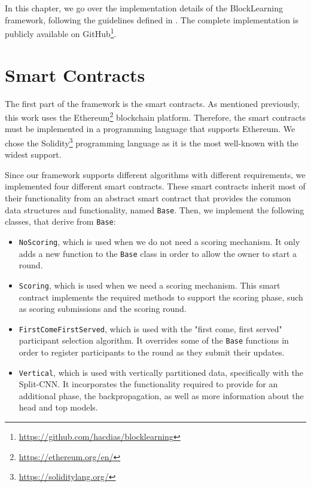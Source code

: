 In this chapter, we go over the implementation details of the BlockLearning framework, following the guidelines defined in . The complete implementation is publicly available on GitHub\footnote{\url{https://github.com/hacdias/blocklearning}}.

\section{Smart Contracts}

The first part of the framework is the smart contracts. As mentioned previously, this work uses the Ethereum\footnote{\url{https://ethereum.org/en/}} blockchain platform. Therefore, the smart contracts must be implemented in a programming language that supports Ethereum. We chose the Solidity\footnote{\url{https://soliditylang.org/}} programming language as it is the most well-known with the widest support.

Since our framework supports different algorithms with different requirements, we implemented four different smart contracts. These smart contracts inherit most of their functionality from an abstract smart contract that provides the common data structures and functionality, named \texttt{Base}. Then, we implement the following classes, that derive from \texttt{Base}:

\begin{itemize}
    \item \texttt{NoScoring}, which is used when we do not need a scoring mechanism. It only adds a new function to the \texttt{Base} class in order to allow the owner to start a round.
    
    \item \texttt{Scoring}, which is used when we need a scoring mechanism. This smart contract implements the required methods to support the scoring phase, such as scoring submissions and the scoring round.
    
    \item \texttt{FirstComeFirstServed}, which is used with the "first come, first served" participant selection algorithm. It overrides some of the \texttt{Base} functions in order to register participants to the round as they submit their updates.
    
    \item \texttt{Vertical}, which is used with vertically partitioned data, specifically with the Split-CNN. It incorporates the functionality required to provide for an additional phase, the backpropagation, as well as more information about the head and top models.
\end{itemize}

